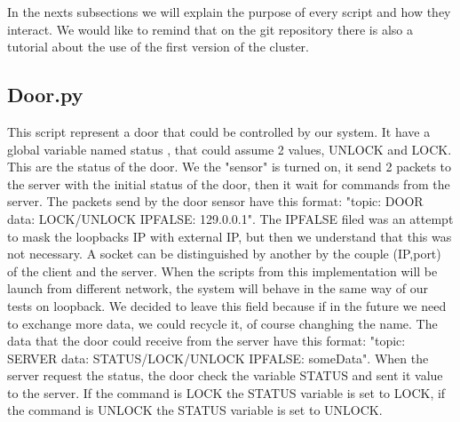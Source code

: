 In the nexts subsections we will explain the purpose of every script and how they interact. We would like to remind that on the git repository there is also a tutorial about the use of the first version of the cluster.
\subsection{Door.py}
This script represent a door that could be controlled by our system. It have a global variable named status , that could assume 2 values, UNLOCK and LOCK.
This are the status of the door. We the "sensor" is turned on,  it send 2 packets to the server with the initial status of the door, then it wait for commands from the server.  The packets send by the door sensor have this format: "topic: DOOR data: LOCK/UNLOCK IPFALSE: 129.0.0.1". The IPFALSE filed was an attempt
to mask the loopbacks IP with external IP, but then we understand that this was not necessary. A socket can be distinguished by another by the couple (IP,port) 
of the client and the server. When the scripts from this implementation will be launch from different network, the system will behave in the same way of  our tests on loopback. We decided to leave this field because if in the future we need to exchange more data, we could recycle it, of course changhing the name.
The data that the door could receive from the server have this format: "topic: SERVER data: STATUS/LOCK/UNLOCK IPFALSE: someData". When the server 
request the status, the door check the variable STATUS and sent it value to the server.  If the command is LOCK the STATUS variable is set to LOCK, if the command is UNLOCK the STATUS variable is set to UNLOCK.



